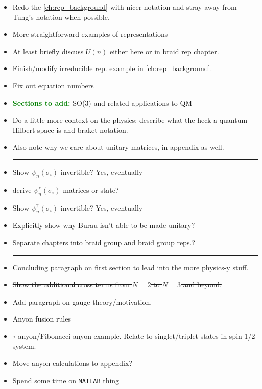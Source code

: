 \begin{itemize}

    \item Redo the \cref{ch:rep_background} with nicer notation and stray away from Tung's notation when possible.
    \item More straightforward examples of representations
    \item At least briefly discuss $U(n)$ either here or in braid rep chapter.
    \item Finish/modify irreducible rep. example in \cref{ch:rep_background}.
    \item Fix out equation numbers
    \item \textcolor{Green}{\textbf{Sections to add:}} SO(3) and related applications to QM
    \item Do a little more context on the physics: describe what the heck a quantum Hilbert space is and braket notation.
    \item Also note why we care about unitary matrices, in appendix as well.
    
    \begin{center}\rule{.85\textwidth}{0.65pt}\end{center}
    
    \item Show $\psi_n(\sigma_i)$ invertible? Yes, eventually
    \item derive $\psi_n^\textbf{r}(\sigma_i)$ matrices or state?
    \item Show $\psi_n^\textbf{r}(\sigma_i)$ invertible? Yes, eventually
    \item \sout{Explicitly show why Burau isn't able to be made unitary?~\cite{Delaney2016}}
    \item Separate chapters into braid group and braid group reps.?
    
    \begin{center}\rule{.85\textwidth}{0.65pt}\end{center}
    
    \item Concluding paragraph on first section to lead into the more physics-y stuff.
    \item \sout{Show the additional cross terms from $N=2$ to $N=3$ and beyond.}
    \item Add paragraph on gauge theory/motivation.
    \item Anyon fusion rules
    \item $\tau$ anyon/Fibonacci anyon example. Relate to singlet/triplet states in spin-1/2 system.
    \item \sout{Move anyon calculations to appendix?}
    \item Spend some time on \texttt{MATLAB} thing


\end{itemize}
